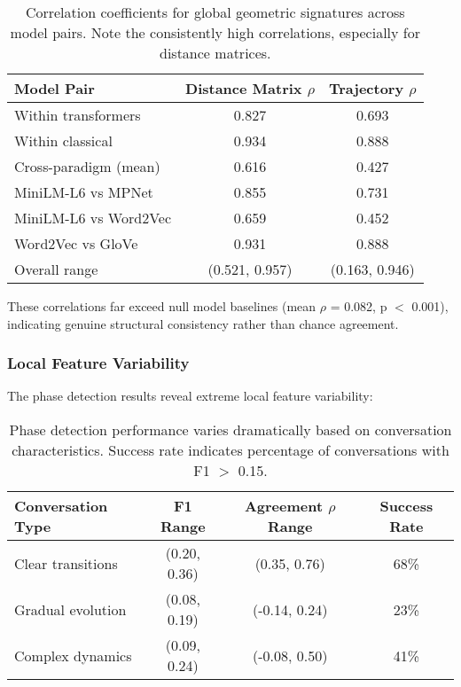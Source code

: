 \documentclass[11pt,letterpaper]{article}
\newcommand{\distanceCorrRange}{(0.521, 0.957)}
\newcommand{\transformerInternalCorr}{0.827}
\newcommand{\classicalInternalCorr}{0.934}
\newcommand{\crossParadigmCorr}{0.616}
\newcommand{\miniLMmpnetCorr}{0.855}
\newcommand{\miniLMwordTovecCorr}{0.659}
\newcommand{\wordTovecGloveCorr}{0.931}
\newcommand{\nullModelPValue}{0.001}
\newcommand{\nullBaselineCorr}{0.082}
\begin{document}
\begin{table}[h]
\centering
\begin{tabular}{lcc}
\toprule
Model Pair & Distance Matrix $\rho$ & Trajectory $\rho$ \\
\midrule
Within transformers & \transformerInternalCorr{} & 0.693 \\
Within classical & \classicalInternalCorr{} & 0.888 \\
Cross-paradigm (mean) & \crossParadigmCorr{} & 0.427 \\
\midrule
MiniLM-L6 vs MPNet & \miniLMmpnetCorr{} & 0.731 \\
MiniLM-L6 vs Word2Vec & \miniLMwordTovecCorr{} & 0.452 \\
Word2Vec vs GloVe & \wordTovecGloveCorr{} & 0.888 \\
\midrule
Overall range & \distanceCorrRange{} & (0.163, 0.946) \\
\bottomrule
\end{tabular}
\caption{Correlation coefficients for global geometric signatures across model pairs. Note the consistently high correlations, especially for distance matrices.}
\label{tab:correlations}
\end{table}

These correlations far exceed null model baselines (mean $\rho$ = \nullBaselineCorr{}, p $<$ \nullModelPValue{}), indicating genuine structural consistency rather than chance agreement.

\subsubsection{Local Feature Variability}

The phase detection results reveal extreme local feature variability:

\begin{table}[h]
\centering
\begin{tabular}{lccc}
\toprule
Conversation Type & F1 Range & Agreement $\rho$ Range & Success Rate \\
\midrule
Clear transitions & (0.20, 0.36) & (0.35, 0.76) & 68\% \\
Gradual evolution & (0.08, 0.19) & (-0.14, 0.24) & 23\% \\
Complex dynamics & (0.09, 0.24) & (-0.08, 0.50) & 41\% \\
\bottomrule
\end{tabular}
\caption{Phase detection performance varies dramatically based on conversation characteristics. Success rate indicates percentage of conversations with F1 $>$ 0.15.}
\label{tab:phase_performance}
\end{table}
\end{document}
